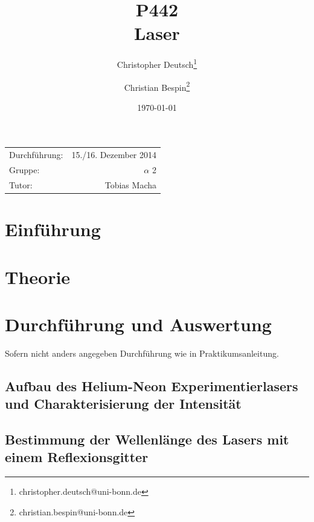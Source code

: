 \documentclass[11pt, a4paper]{article}
\title{P442 \\ Laser}
\author{Christopher Deutsch\footnote{christopher.deutsch@uni-bonn.de} \and Christian Bespin\footnote{christian.bespin@uni-bonn.de}}
\date{\today}
\numberwithin{equation}{section}
\begin{document}
\begin{titlepage}

\maketitle

\begin{center}
\begin{tabular}{l r}
Durchführung: & 15./16. Dezember 2014 \\
Gruppe: & $\alpha$ 2 \\
Tutor: & Tobias Macha
\end{tabular}
\end{center}

\begin{abstract}
\noindent

\end{abstract}

\end{titlepage}

\tableofcontents
\newpage


\section{Einführung}

\section{Theorie}

\section{Durchführung und Auswertung}
Sofern nicht anders angegeben Durchführung wie in Praktikumsanleitung.

\subsection{Aufbau des Helium-Neon Experimentierlasers und Charakterisierung der Intensität}

\subsection{Bestimmung der Wellenlänge des Lasers mit einem Reflexionsgitter}
\end{document}
